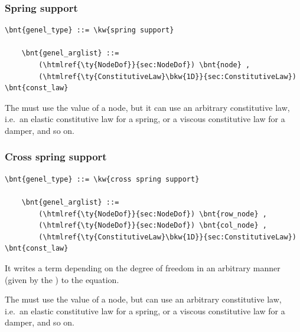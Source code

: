 \subsubsection{Spring support}
\label{sec:EL:GENEL:SPRING-SUPPORT}
\begin{Verbatim}[commandchars=\\\{\}]
    \bnt{genel_type} ::= \kw{spring support}

    \bnt{genel_arglist} ::=
        (\htmlref{\ty{NodeDof}}{sec:NodeDof}) \bnt{node} ,
        (\htmlref{\ty{ConstitutiveLaw}\bkw{1D}}{sec:ConstitutiveLaw}) \bnt{const_law}
\end{Verbatim}
The  must use the  value of a 
 node, but it can use an arbitrary constitutive law,
i.e.\ an elastic constitutive law for a spring, or a viscous
constitutive law for a damper, and so on.

\subsubsection{Cross spring support}
\label{sec:EL:GENEL:CROSS-SPRING-SUPPORT}
\begin{Verbatim}[commandchars=\\\{\}]
    \bnt{genel_type} ::= \kw{cross spring support}

    \bnt{genel_arglist} ::=
        (\htmlref{\ty{NodeDof}}{sec:NodeDof}) \bnt{row_node} ,
        (\htmlref{\ty{NodeDof}}{sec:NodeDof}) \bnt{col_node} ,
        (\htmlref{\ty{ConstitutiveLaw}\bkw{1D}}{sec:ConstitutiveLaw}) \bnt{const_law}
\end{Verbatim}
It writes a term depending on the  degree of freedom in an
arbitrary manner (given by the ) to the 
 equation.

The  must use the  value
of a  node, but can use an arbitrary constitutive law,
i.e.\ an elastic constitutive law for a spring, or a viscous
constitutive law for a damper, and so on.

